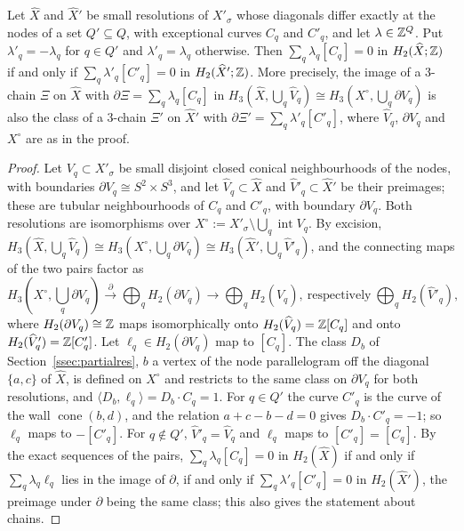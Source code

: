 \begin{lemma}[flops]\label{lem:flop}
Let $\widehat X$ and $\widehat X'$ be small resolutions of $X'_\sigma$ whose diagonals differ exactly at the nodes of a set
$Q'\subseteq Q$, with exceptional curves $C_q$ and $C'_q$, and let $\lambda\in\mathbb Z^Q$. Put $\lambda'_q=-\lambda_q$ for $q\in Q'$ and
$\lambda'_q=\lambda_q$ otherwise. Then $\sum_q\lambda_q[C_q]=0$ in $H_2(\widehat X;\mathbb Z)$ if and only if
$\sum_q\lambda'_q[C'_q]=0$ in $H_2(\widehat X';\mathbb Z)$. More precisely, the image of a $3$-chain $\Xi$ on $\widehat X$ with
$\partial\Xi=\sum_q\lambda_q[C_q]$ in $H_3(\widehat X,\bigcup_q\widehat V_q)\cong H_3(X^\circ,\bigcup_q\partial V_q)$ is also the
class of a $3$-chain $\Xi'$ on $\widehat X'$ with $\partial\Xi'=\sum_q\lambda'_q[C'_q]$, where $\widehat V_q$, $\partial V_q$ and
$X^\circ$ are as in the proof.
\end{lemma}
\begin{proof}
Let $V_q\subset X'_\sigma$ be small disjoint closed conical neighbourhoods of the nodes, with boundaries
$\partial V_q\cong S^2\times S^3$, and let $\widehat V_q\subset\widehat X$ and $\widehat V'_q\subset\widehat X'$ be their
preimages; these are tubular neighbourhoods of $C_q$ and $C'_q$, with boundary $\partial V_q$. Both resolutions are isomorphisms
over $X^\circ:=X'_\sigma\setminus\bigcup_q\operatorname{int}V_q$. By excision,
$H_3(\widehat X,\bigcup_q\widehat V_q)\cong H_3(X^\circ,\bigcup_q\partial V_q)\cong H_3(\widehat X',\bigcup_q\widehat V'_q)$, and
the connecting maps of the two pairs factor as
\[
H_3(X^\circ,\textstyle\bigcup_q\partial V_q)\xrightarrow{\ \partial\ }\bigoplus_qH_2(\partial V_q)\longrightarrow
\bigoplus_qH_2(\widehat V_q),\ \text{respectively}\ \bigoplus_qH_2(\widehat V'_q),
\]
where $H_2(\partial V_q)\cong\mathbb Z$ maps isomorphically onto $H_2(\widehat V_q)=\mathbb Z[C_q]$ and onto $H_2(\widehat V'_q)=\mathbb Z[C'_q]$.
Let $\ell_q\in H_2(\partial V_q)$ map to $[C_q]$. The class $D_b$ of Section~\ref{ssec:partialres}, $b$ a vertex of the node
parallelogram off the diagonal $\{a,c\}$ of $\widehat X$, is defined on $X^\circ$ and restricts to the same class on $\partial
V_q$ for both resolutions, and $\langle D_b,\ell_q\rangle=D_b\cdot C_q=1$. For $q\in Q'$ the curve $C'_q$ is the curve of the wall
$\operatorname{cone}(b,d)$, and the relation $a+c-b-d=0$ gives $D_b\cdot C'_q=-1$; so $\ell_q$ maps to $-[C'_q]$. For $q\notin Q'$,
$\widehat V'_q=\widehat V_q$ and $\ell_q$ maps to $[C'_q]=[C_q]$. By the exact sequences of the pairs,
$\sum_q\lambda_q[C_q]=0$ in $H_2(\widehat X)$ if and only if $\sum_q\lambda_q\ell_q$ lies in the image of $\partial$, if and only
if $\sum_q\lambda'_q[C'_q]=0$ in $H_2(\widehat X')$, the preimage under $\partial$ being the same class; this also gives the
statement about chains.
\end{proof}

